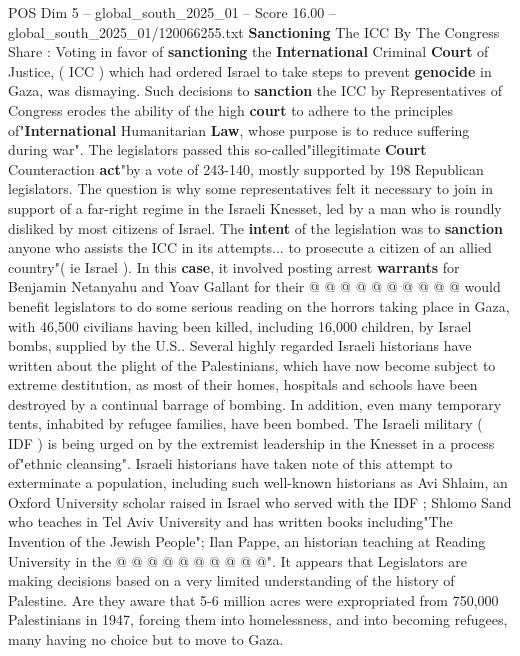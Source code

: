 \begin{textsample}{POS Dim 5 – global\_south\_2025\_01 – Score 16.00 – global\_south\_2025\_01/120066255.txt}  \label{ex:f5_pos_352}
\textbf{Sanctioning} The ICC By The Congress Share : Voting in favor of \textbf{sanctioning} the \textbf{International} Criminal \textbf{Court} of Justice, ( ICC ) which had ordered Israel to take steps to prevent \textbf{genocide} in Gaza, was dismaying.
Such decisions to \textbf{sanction} the ICC by Representatives of Congress erodes the ability of the high \textbf{court} to adhere to the principles of"\textbf{International} Humanitarian \textbf{Law}, whose purpose is to reduce suffering during war".
The legislators passed this so-called"illegitimate \textbf{Court} Counteraction \textbf{act}"by a vote of 243-140, mostly supported by 198 Republican legislators.
The question is why some representatives felt it necessary to join in support of a far-right regime in the Israeli Knesset, led by a man who is roundly disliked by most citizens of Israel.
The \textbf{intent} of the legislation was to \textbf{sanction} anyone who assists the ICC in its attempts... to prosecute a citizen of an allied country"( ie Israel ).
In this \textbf{case}, it involved posting arrest \textbf{warrants} for Benjamin Netanyahu and Yoav Gallant for their @ @ @ @ @ @ @ @ @ @ would benefit legislators to do some serious reading on the horrors taking place in Gaza, with 46,500 civilians having been killed, including 16,000 children, by Israel bombs, supplied by the U.S..
Several highly regarded Israeli historians have written about the plight of the Palestinians, which have now become subject to extreme destitution, as most of their homes, hospitals and schools have been destroyed by a continual barrage of bombing.
In addition, even many temporary tents, inhabited by refugee families, have been bombed.
The Israeli military ( IDF ) is being urged on by the extremist leadership in the Knesset in a process of"ethnic cleansing".
Israeli historians have taken note of this attempt to exterminate a population, including such well-known historians as Avi Shlaim, an Oxford University scholar raised in Israel who served with the IDF ; Shlomo Sand who teaches in Tel Aviv University and has written books including"The Invention of the Jewish People"; Ilan Pappe, an historian teaching at Reading University in the @ @ @ @ @ @ @ @ @ @".
It appears that Legislators are making decisions based on a very limited understanding of the history of Palestine.
Are they aware that 5-6 million acres were expropriated from 750,000 Palestinians in 1947, forcing them into homelessness, and into becoming refugees, many having no choice but to move to Gaza.

\end{textsample}
